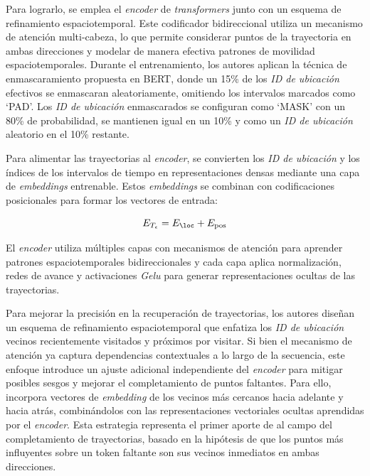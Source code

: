 Para lograrlo, se emplea el \textit{encoder} de \textit{transformers} junto con un esquema de refinamiento espaciotemporal. Este codificador bidireccional utiliza un mecanismo de atención multi-cabeza, lo que permite considerar puntos de la trayectoria en ambas direcciones y modelar de manera efectiva patrones de movilidad espaciotemporales. Durante el entrenamiento, los autores aplican la técnica de enmascaramiento propuesta en BERT, donde un 15\% de los \textit{ID de ubicación} efectivos se enmascaran aleatoriamente, omitiendo los intervalos marcados como ‘PAD’. Los \textit{ID de ubicación} enmascarados se configuran como ‘MASK’ con un 80\% de probabilidad, se mantienen igual en un 10\% y como un \textit{ID de ubicación} aleatorio en el 10\% restante.

Para alimentar las trayectorias al \textit{encoder}, se convierten los \textit{ID de ubicación} y los índices de los intervalos de tiempo en representaciones densas mediante una capa de \textit{embeddings} entrenable. Estos \textit{embeddings} se combinan con codificaciones posicionales para formar los vectores de entrada:

\begin{equation}
E_{T_\epsilon} = E_{\loc} + E_{\text{pos}}
\end{equation}

El \textit{encoder} utiliza múltiples capas con mecanismos de atención para aprender patrones espaciotemporales bidireccionales y cada capa aplica normalización, redes de avance y activaciones \textit{Gelu} \cite{lee2023gelu} para generar representaciones ocultas de las trayectorias.

Para mejorar la precisión en la recuperación de trayectorias, los autores diseñan un esquema de refinamiento espaciotemporal que enfatiza los \textit{ID de ubicación} vecinos recientemente visitados y próximos por visitar. Si bien el mecanismo de atención ya captura dependencias contextuales a lo largo de la secuencia, este enfoque introduce un ajuste adicional independiente del \textit{encoder} para mitigar posibles sesgos y mejorar el completamiento de puntos faltantes. Para ello, incorpora vectores de \textit{embedding} de los vecinos más cercanos hacia adelante y hacia atrás, combinándolos con las representaciones vectoriales ocultas aprendidas por el \textit{encoder}. Esta estrategia representa el primer aporte de \cite{si2023trajbert} al campo del completamiento de trayectorias, basado en la hipótesis de que los puntos más influyentes sobre un token faltante son sus vecinos inmediatos en ambas direcciones.

